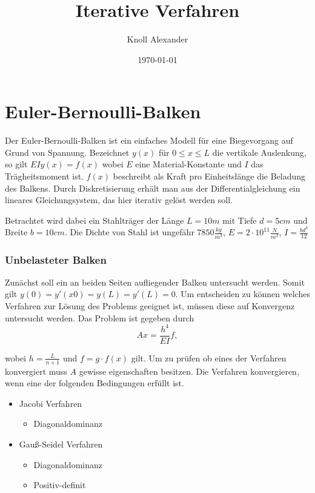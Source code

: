 \documentclass[12pt,titlepage]{article}
\author{Knoll Alexander }
\title{Iterative Verfahren}
\date{\today}
\begin{document}
\maketitle

\part*{Euler-Bernoulli-Balken}

	Der Euler-Bernoulli-Balken ist ein einfaches Modell für eine Biegevorgang auf Grund von
	Spannung. Bezeichnet $y(x)$ für $0 \leq x \leq L$ die vertikale Auslenkung, so gilt
	$EIy (x) = f (x)$ wobei $E$ eine Material-Konstante und $I$ das Trägheitsmoment ist. 
	$f(x)$ beschreibt als Kraft pro Einheitslänge die Beladung des Balkens. Durch Diskretisierung erhält man aus der Differentialgleichung ein lineares Gleichungsystem, das hier iterativ gelöst werden soll.
	
	Betrachtet wird dabei ein Stahlträger der Länge $L = 10m$ mit Tiefe $d = 5cm$ und Breite $b = 10cm$. Die Dichte von Stahl ist ungefähr $7850 \frac{kg}{m^3}$, 
	$E = 2 \cdot 10^11 \frac{N}{m^2}$, $I = \frac{bd^3}{12}$

\section{Unbelasteter Balken}

	Zunächst soll ein an beiden Seiten aufliegender Balken untersucht werden.
	Somit gilt $y(0) = y'(x0) = y(L) = y'(L) = 0 $.\newline
	Um entscheiden zu können welches Verfahren zur Lösung des Problems geeignet ist, müssen diese auf Konvergenz untersucht werden. Das Problem ist gegeben durch
	\begin{equation}
		Ax = \frac{h^4}{EI}f,
	\end{equation}
	
	wobei $h = \frac{L}{n+1}$ und $f = g \cdot f(x)$ gilt. Um zu prüfen ob eines der Verfahren konvergiert muss $A$ gewisse eigenschaften besitzen. Die Verfahren konvergieren, wenn eine der folgenden Bedingungen erfüllt ist.
	
	\begin{itemize}
		\centering
		\item Jacobi Verfahren
		\begin{itemize}
			\centering	
			\item Diagonaldominanz
		\end{itemize}
		\item Gauß-Seidel Verfahren
		\begin{itemize}
			\centering
			\item Diagonaldominanz
			\item Positiv-definit
		\end{itemize}
	\end{itemize}
	
\end{document}
